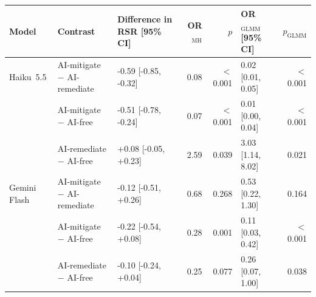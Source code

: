 \begin{tabular}{lllrrlr}
\toprule
Model & Contrast & Difference in RSR [95\% CI] & OR$_{\mathrm{MH}}$ & $p$ & OR$_{\mathrm{GLMM}}$ [95\% CI] & $p_{\mathrm{GLMM}}$ \\
\midrule
Haiku~5.5 & AI-mitigate $-$ AI-remediate & -0.59 [-0.85, -0.32] & 0.08 & $<$0.001 & 0.02 [0.01, 0.05] & $<$0.001 \\
 & AI-mitigate $-$ AI-free & -0.51 [-0.78, -0.24] & 0.07 & $<$0.001 & 0.01 [0.00, 0.04] & $<$0.001 \\
 & AI-remediate $-$ AI-free & +0.08 [-0.05, +0.23] & 2.59 & 0.039 & 3.03 [1.14, 8.02] & 0.021 \\
\midrule
Gemini Flash & AI-mitigate $-$ AI-remediate & -0.12 [-0.51, +0.26] & 0.68 & 0.268 & 0.53 [0.22, 1.30] & 0.164 \\
 & AI-mitigate $-$ AI-free & -0.22 [-0.54, +0.08] & 0.28 & 0.001 & 0.11 [0.03, 0.42] & $<$0.001 \\
 & AI-remediate $-$ AI-free & -0.10 [-0.24, +0.04] & 0.25 & 0.077 & 0.26 [0.07, 1.00] & 0.038 \\
\bottomrule
\end{tabular}

